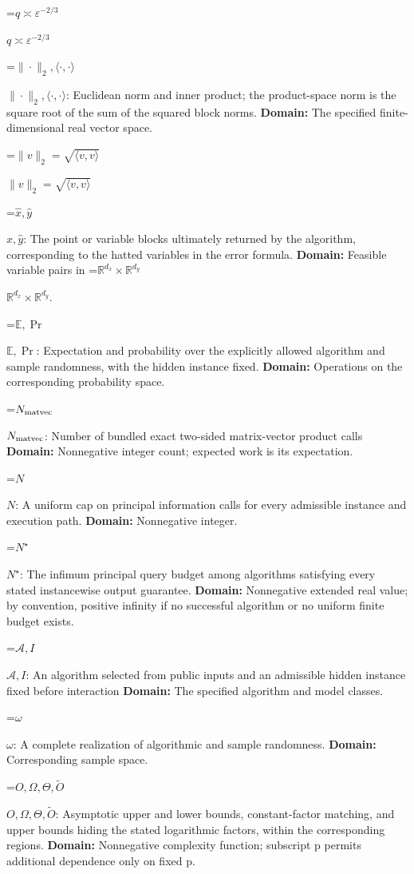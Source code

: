 \documentclass[10pt,a4paper]{article}
\newcommand{\AtlasMath}[1]{\par\begingroup\centering\setbox0=\hbox{$\displaystyle #1$}\ifdim\wd0>1.4\linewidth\typeout{ATLAS WIDE FORMULA: \the\wd0}\fi\ifdim\wd0>\linewidth\resizebox{\linewidth}{!}{\box0}\else\box0\fi\par\endgroup}
\newcommand{\AtlasInlineMath}[1]{\begingroup\setbox0=\hbox{$#1$}\ifdim\wd0>.4\linewidth\endgroup\AtlasMath{#1}\else\endgroup$#1$\fi}
\begin{document}
\AtlasInlineMath{q\asymp\varepsilon^{-2/3}}



\AtlasInlineMath{\|\cdot\|_2,\langle\cdot,\cdot\rangle}: Euclidean norm and inner product; the product-space norm is the square root of the sum of the squared block norms. \textbf{Domain:} The specified finite-dimensional real vector space.



\AtlasInlineMath{\|v\|_2=\sqrt{\langle v,v\rangle}}



\AtlasInlineMath{\widehat x,\widehat y}: The point or variable blocks ultimately returned by the algorithm, corresponding to the hatted variables in the error formula. \textbf{Domain:} Feasible variable pairs in \AtlasInlineMath{\mathbb R^{d_x}\times\mathbb R^{d_y}}.



\AtlasInlineMath{\mathbb E,\Pr}: Expectation and probability over the explicitly allowed algorithm and sample randomness, with the hidden instance fixed. \textbf{Domain:} Operations on the corresponding probability space.



\AtlasInlineMath{N_{\rm matvec}}: Number of bundled exact two-sided matrix-vector product calls \textbf{Domain:} Nonnegative integer count; expected work is its expectation.



\AtlasInlineMath{N}: A uniform cap on principal information calls for every admissible instance and execution path. \textbf{Domain:} Nonnegative integer.



\AtlasInlineMath{N^\star}: The infimum principal query budget among algorithms satisfying every stated instancewise output guarantee. \textbf{Domain:} Nonnegative extended real value; by convention, positive infinity if no successful algorithm or no uniform finite budget exists.



\AtlasInlineMath{\mathcal A,I}: An algorithm selected from public inputs and an admissible hidden instance fixed before interaction \textbf{Domain:} The specified algorithm and model classes.



\AtlasInlineMath{\omega}: A complete realization of algorithmic and sample randomness. \textbf{Domain:} Corresponding sample space.



\AtlasInlineMath{O,\Omega,\Theta,\widetilde O}: Asymptotic upper and lower bounds, constant-factor matching, and upper bounds hiding the stated logarithmic factors, within the corresponding regions. \textbf{Domain:} Nonnegative complexity function; subscript p permits additional dependence only on fixed p.
\end{document}
